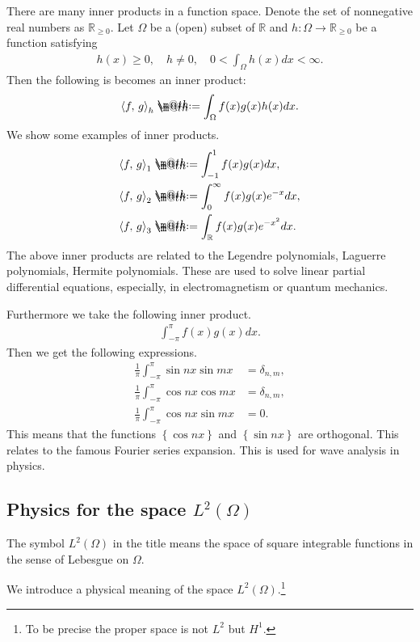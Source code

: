 \documentclass[openany, a4paper, oneside]{jsbook}
\makeatletter
\newcommand*{\defeq}{\mathrel{\rlap{%
\raisebox{0.3ex}{$\m@th\cdot$}}%
\raisebox{-0.3ex}{$\m@th\cdot$}}%
=}
\theoremstyle{break}
\theoremstyle{breakdefn}
\newcommand{\rbk}[1]{\left (#1\right)}
\newcommand{\cbk}[1]{\left\{#1\right\}}
\newcommand{\bkt}[2]{\left\langle#1,\,#2\right\rangle}
\newcommand{\bbR}{\mathbb{R}}
\makeatother
\begin{document}
There are many inner products in a function space.
Denote the set of nonnegative real numbers as $\bbR_{\geq 0}$.
Let $\Omega$ be a (open) subset of $\bbR$ and $h \colon \Omega \to \bbR_{\geq 0}$ be a function satisfying
\begin{align}
 h(x) \geq 0, \quad
 h \neq 0, \quad
 0 < \int_\Omega h(x) dx < \infty.
\end{align}
Then the following is becomes an inner product:
\begin{align}
 \bkt{f}{g}_{h}
 \defeq
 \int_{\Omega} f(x) g(x) h(x) dx.
\end{align}
We show some examples of inner products.
\begin{align}
 \bkt{f}{g}_1
 &\defeq
 \int_{-1}^{1} f(x) g(x) dx, \\
 \bkt{f}{g}_2
 &\defeq
 \int_{0}^{\infty} f(x) g(x) e^{-x} dx, \\
 \bkt{f}{g}_3
 &\defeq
 \int_{\bbR} f(x) g(x) e^{-x^2} dx.
\end{align}
The above inner products are related to
the Legendre polynomials, Laguerre polynomials, Hermite polynomials.
These are used to solve linear partial differential equations,
especially, in electromagnetism or quantum mechanics.

Furthermore we take the following inner product.
\begin{align}
 \int_{- \pi}^{\pi} f(x) g(x) dx.
\end{align}
Then we get the following expressions.
\begin{align}
 \frac{1}{\pi} \int_{-\pi}^{\pi} \sin nx \sin mx
 &=
 \delta_{n,m}, \\
 \frac{1}{\pi} \int_{-\pi}^{\pi} \cos nx \cos mx
 &=
 \delta_{n,m}, \\
 \frac{1}{\pi} \int_{-\pi}^{\pi} \cos nx \sin mx
 &= 0.
\end{align}
This means that the functions $\cbk{\cos nx}$ and $\cbk{\sin nx}$ are orthogonal.
This relates to the famous Fourier series expansion.
This is used for wave analysis in physics.
\subsection{Physics for the space $L^2 \rbk{\Omega}$}


The symbol $L^2 \rbk{\Omega}$ in the title means
the space of square integrable functions in the sense of Lebesgue on $\Omega$.

We introduce a physical meaning of the space $L^2 \rbk{\Omega}$.\footnote{To be precise the proper space is not $L^2$ but $H^1$.
 }
\end{document}
